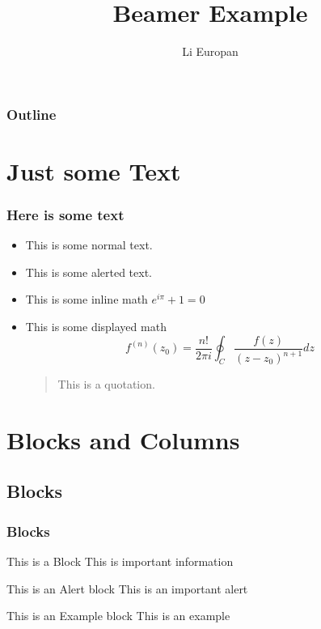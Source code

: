 \documentclass{beamer}
\title{Beamer Example}
\author{Li Europan}
\institute[LI]{LoremIpsum}
\date{}
\newcommand{\be}{\begin{equation}}
\newcommand{\ee}{\end{equation}}
\begin{document}
	\begin{frame}[plain]
	  \titlepage
	\end{frame}
	\begin{frame}
  		\frametitle{Outline}
		\tableofcontents
	\end{frame}
	
	\section{Just some Text}
		\begin{frame}
			\frametitle{Here is some text}
				\begin{itemize}[<+->]
				\item This is some normal text.\\
				\item This is some \alert{alerted text.}\\
				\item This is some inline math $e^{i\pi} + 1 =0$
				\item This is some displayed math
						\be
							f^{(n)}(z_0) = \frac{n!}{2\pi i}\oint_C \frac{f(z)}{(z-z_0)^{n+1}} dz
						\ee
				 \begin{quotation}
				  This is a quotation.
				 \end{quotation}
			\end{itemize}
		\end{frame}

	\section{Blocks and Columns}
		\subsection{Blocks}
			\begin{frame}
	 		\frametitle{Blocks}
			   \begin{block}{This is a Block}
			      This is important information
			   \end{block}
			 
			   \begin{alertblock}{This is an Alert block}
			   This is an important alert
			   \end{alertblock}

			   \begin{exampleblock}{This is an Example block}
			   This is an example 
			   \end{exampleblock}
			\end{frame}
		
\end{document}
